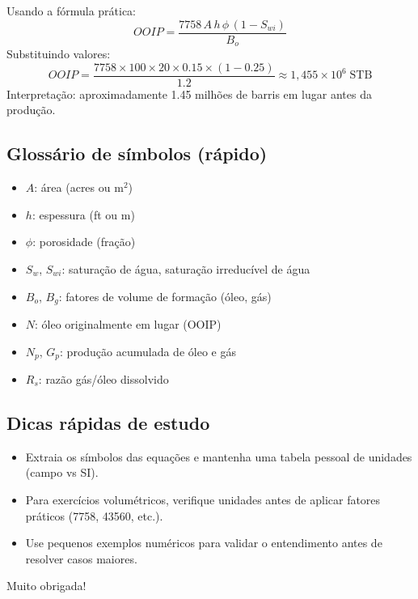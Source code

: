 \documentclass[11pt,a4paper]{article}
\begin{document}
Usando a fórmula prática:
$$
OOIP = \frac{7758\,A\,h\,\phi\,(1-S_{wi})}{B_o}
$$
Substituindo valores:
$$
OOIP = \frac{7758 \times 100 \times 20 \times 0.15 \times (1-0.25)}{1.2} \approx 1{,}455\times10^{6}\;\text{STB}
$$
Interpretação: aproximadamente 1.45 milhões de barris em lugar antes da produção.

\subsection{Glossário de símbolos (rápido)}
\begin{itemize}
\item $A$: área (acres ou m$^2$)
\item $h$: espessura (ft ou m)
\item $\phi$: porosidade (fração)
\item $S_w$, $S_{wi}$: saturação de água, saturação irreducível de água
\item $B_o$, $B_g$: fatores de volume de formação (óleo, gás)
\item $N$: óleo originalmente em lugar (OOIP)
\item $N_p$, $G_p$: produção acumulada de óleo e gás
\item $R_s$: razão gás/óleo dissolvido
\end{itemize}

\subsection{Dicas rápidas de estudo}
\begin{itemize}
\item Extraia os símbolos das equações e mantenha uma tabela pessoal de unidades (campo vs SI).
\item Para exercícios volumétricos, verifique unidades antes de aplicar fatores práticos (7758, 43560, etc.).
\item Use pequenos exemplos numéricos para validar o entendimento antes de resolver casos maiores.
\end{itemize}


Muito obrigada!
\end{document}
